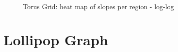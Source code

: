  \begin{figure}
     \centering
     \caption{Torus Grid: heat map of slopes per region - log-log}
     \label{fig:torusgraphslopes}
 \end{figure}

 \section{Lollipop Graph}\label{sec:lollipopgraph}
